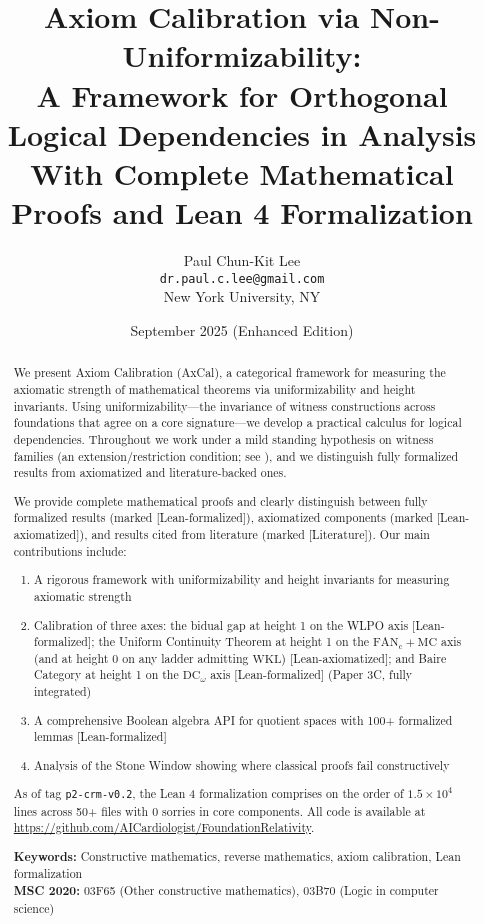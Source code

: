 \documentclass[11pt]{article}
\title{Axiom Calibration via Non-Uniformizability:\\
A Framework for Orthogonal Logical Dependencies in Analysis\\
\Large{With Complete Mathematical Proofs and Lean 4 Formalization}}
\author{Paul Chun-Kit Lee\\
\texttt{dr.paul.c.lee@gmail.com}\\
New York University, NY}
\date{September 2025 (Enhanced Edition)}
\theoremstyle{plain}
\theoremstyle{definition}
\newcommand{\DCw}{\mathrm{DC}_\omega}
\newcommand{\MC}{\mathrm{MC}}            %
\newcommand{\WKL}{\mathrm{WKL}}
\newcommand{\FTc}{\mathrm{FAN}_{\mathrm{c}}}  %
\newcommand{\leanok}{\textsf{\textcolor{green!70!black}{[Lean-formalized]}}}
\newcommand{\leanaxiom}{\textsf{\textcolor{orange!80!black}{[Lean-axiomatized]}}}
\newcommand{\leancited}{\textsf{\textcolor{blue!70!black}{[Literature]}}}
\begin{document}
\maketitle

\begin{abstract}
We present Axiom Calibration (AxCal), a categorical framework for measuring the axiomatic strength of mathematical theorems via uniformizability and height invariants. Using uniformizability—the invariance of witness constructions across foundations that agree on a core signature—we develop a practical calculus for logical dependencies. Throughout we work under a mild standing hypothesis on witness families (an extension/restriction condition; see ), and we distinguish fully formalized results from axiomatized and literature-backed ones. 

We provide complete mathematical proofs and clearly distinguish between fully formalized results (marked \leanok), axiomatized components (marked \leanaxiom), and results cited from literature (marked \leancited). Our main contributions include:
\begin{enumerate}
\item A rigorous framework with uniformizability and height invariants for measuring axiomatic strength
\item Calibration of three axes: the bidual gap at height 1 on the WLPO axis \leanok; the Uniform Continuity Theorem at height 1 on the \(\FTc+\MC\) axis (and at height 0 on any ladder admitting \(\WKL\)) \leanaxiom; and Baire Category at height 1 on the \(\DCw\) axis \leanok{} (Paper 3C, fully integrated)
\item A comprehensive Boolean algebra API for quotient spaces with 100+ formalized lemmas \leanok
\item Analysis of the Stone Window showing where classical proofs fail constructively
\end{enumerate}

As of tag \texttt{p2-crm-v0.2}, the Lean 4 formalization comprises on the order of $1.5\times 10^4$ lines across 50+ files with 0 sorries in core components. All code is available at \url{https://github.com/AICardiologist/FoundationRelativity}.

\vspace{0.5em}
\noindent\textbf{Keywords:} Constructive mathematics, reverse mathematics, axiom calibration, Lean formalization\\
\textbf{MSC 2020:} 03F65 (Other constructive mathematics), 03B70 (Logic in computer science)
\end{abstract}
\end{document}

